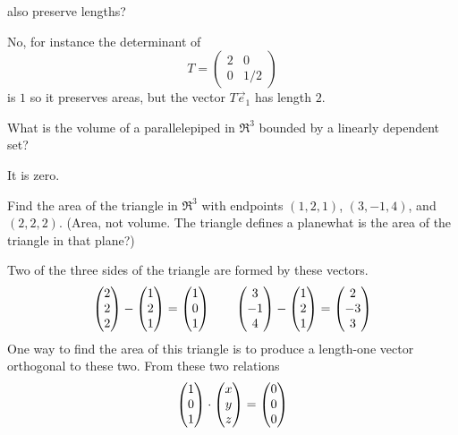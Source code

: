 \begin{exercises}
    also preserve lengths?
    \begin{answer}
      No, for instance the determinant of 
      \begin{equation*}
        T=\begin{pmatrix}
          2  &0  \\
          0  &1/2
        \end{pmatrix}
      \end{equation*}
      is \( 1 \) so it preserves areas, but the vector \( T\vec{e}_1 \)
      has length \( 2 \).  
    \end{answer}
  \recommended \item
    What is the volume of a parallelepiped in \( \Re^3 \) bounded by a
    linearly dependent set?
    \begin{answer}
       It is zero.  
    \end{answer}
  \recommended \item
    Find the area of the triangle in \( \Re^3 \) with endpoints
    \( (1,2,1) \), \( (3,-1,4) \), and \( (2,2,2) \).
    (Area, not volume.
    The triangle defines a plane\Dash what is the area of the triangle in that
    plane?)
    \begin{answer}
      Two of the three sides of the triangle are formed by these vectors.
      \begin{equation*}
        \begin{pmatrix} 2 \\ 2 \\ 2 \end{pmatrix}-\begin{pmatrix} 1 \\ 2 \\ 1 \end{pmatrix}=\begin{pmatrix} 1 \\ 0 \\ 1 \end{pmatrix}
        \qquad
        \begin{pmatrix} 3 \\ -1 \\ 4 \end{pmatrix}-\begin{pmatrix} 1 \\ 2 \\ 1 \end{pmatrix}=\begin{pmatrix} 2 \\ -3 \\ 3 \end{pmatrix}
      \end{equation*}
      One way to find the area of this triangle is to produce a length-one
      vector orthogonal to these two.
      From these two relations
      \begin{equation*}
        \colvec{1 \\ 0 \\ 1}
        \cdot\colvec{x \\ y \\ z}
        =\colvec{0 \\ 0 \\ 0}

\end{equation*}
\end{answer}
\end{exercises}
